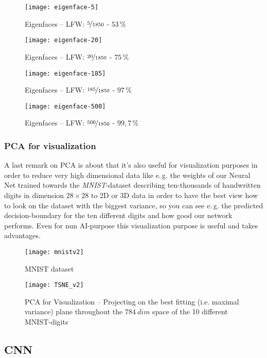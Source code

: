\documentclass[dvipsnames,twocolumn]{scrartcl}
\begin{document}
	\begin{figure}
		\caption{Eigenfaces -- LFW: $\nicefrac{5}{1850}$ - $53\,\%$}
		\texttt{[image: eigenface-5]}
	\end{figure}
	\begin{figure}
		\caption{Eigenfaces -- LFW: $\nicefrac{20}{1850}$ - $75\,\%$}
		\texttt{[image: eigenface-20]}
	\end{figure}
	\begin{figure}
		\caption{Eigenfaces -- LFW: $\nicefrac{185}{1850}$ - $97\,\%$}
		\texttt{[image: eigenface-185]}
	\end{figure}
	\begin{figure}
		\caption{Eigenfaces -- LFW: $\nicefrac{500}{1850}$ - $99,7\,\%$}
		\texttt{[image: eigenface-500]}
	\end{figure}
	
	\subsubsection{PCA for visualization}
	
	A last remark on PCA is about that it's also useful for visualization purposes in order to reduce very high dimensional data like e.\,g. the weights of our Neural Net trained towards the \emph{MNIST}-dataset describing ten-thousands of handwritten digits in dimension $28\times 28$ to 2D or 3D data in order to have the best view how to look on the dataset with the biggest variance, so you can see e.\,g. the predicted decision-boundary for the ten different digits and how good our network performs. Even for nun AI-purpose this visualization purpose is useful and takes advantages.
	
	\begin{figure}
		\caption{MNIST dataset~\cite{mnist}}
		\texttt{[image: mnistv2]}
	\end{figure}
	
	\begin{figure}
		\caption{PCA for Visualization -- Projecting on the best fitting (i.e. maximal variance) plane throughout the $784~dim$ space of the 10 different MNIST-digits}
		\texttt{[image: TSNE\_v2]}
	\end{figure}
	
	\subsection{CNN}
	
\end{document}
